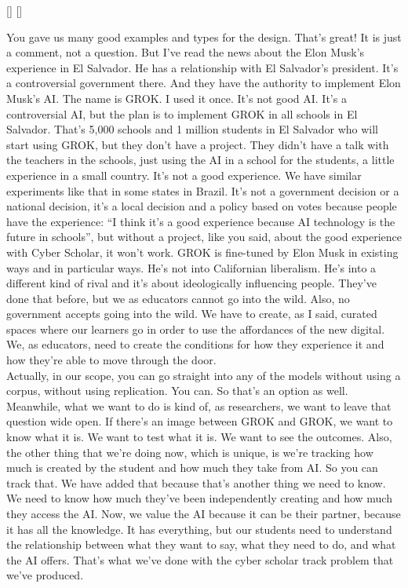 \documentclass[english]{textolivre}
\begin{document}
\renewcommand{\interviewdate}{\today}
\renewcommand{\interviewcontext}{
    \textbf{Context:} This is a template interview.
}
[\interviewerfname]
[\intervieweefname]
\renewcommand{\interviewcontent}{
    \Qu You gave us many good examples and types for the design. That’s great! It is just a comment, not a question. But I’ve read the news about the Elon Musk’s experience in El Salvador. He has a relationship with El Salvador’s president. It’s a controversial government there. And they have the authority to implement Elon Musk’s AI. The name is GROK. I used it once. It’s not good AI. It’s a controversial AI, but the plan is to implement GROK in all schools in El Salvador. That’s 5,000 schools and 1 million students in El Salvador who will start using GROK, but they don’t have a project. They didn’t have a talk with the teachers in the schools, just using the AI in a school for the students, a little experience in a small country. It’s not a good experience. We have similar experiments like that in some states in Brazil. It’s not a government decision or a national decision, it’s a local decision and a policy based on votes because people have the experience: “I think it’s a good experience because AI technology is the future in schools”, but without a project, like you said, about the good experience with Cyber Scholar, it won’t work.
    \An GROK is fine-tuned by Elon Musk in existing ways and in particular ways. He’s not into Californian liberalism. He’s into a different kind of rival and it’s about ideologically influencing people. They’ve done that before, but we as educators cannot go into the wild. Also, no government accepts going into the wild. We have to create, as I said, curated spaces where our learners go in order to use the affordances of the new digital. We, as educators, need to create the conditions for how they experience it and how they’re able to move through the door. \\
    Actually, in our scope, you can go straight into any of the models without using a corpus, without using replication. You can. So that’s an option as well. Meanwhile, what we want to do is kind of, as researchers, we want to leave that question wide open. If there’s an image between GROK and GROK, we want to know what it is. We want to test what it is. We want to see the outcomes. Also, the other thing that we’re doing now, which is unique, is we’re tracking how much is created by the student and how much they take from AI. So you can track that. We have added that because that’s another thing we need to know. We need to know how much they’ve been independently creating and how much they access the AI. Now, we value the AI because it can be their partner, because it has all the knowledge. It has everything, but our students need to understand the relationship between what they want to say, what they need to do, and what the AI offers. That’s what we’ve done with the cyber scholar track problem that we’ve produced.
}
    \begin{description}
        \interviewcontent
    \end{description}
\end{document}

